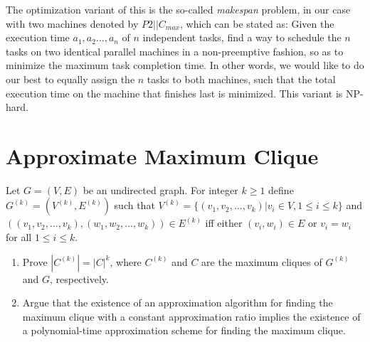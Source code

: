 \documentclass[11pt]{article}
\begin{document}
    The optimization variant of this is the so-called \textit{makespan} problem, in our case with two machines denoted by $P2||C_{max}$\autocite{Schuurman00}, which can be stated as: Given the execution time $a_1, a_2 \dots, a_n$ of $n$ independent tasks, find a way to schedule the $n$ tasks on two identical parallel machines in a non-preemptive fashion, so as to minimize the maximum task completion time. In other words, we would like to do our best to equally assign the $n$ tasks to both machines, such that the total execution time on the machine that finishes last is minimized. This variant is NP-hard.\autocite{Karp72}

  \section{Approximate Maximum Clique}
    Let $G = (V,E)$ be an undirected graph. For integer $k \geq 1$ define $G^{(k)} = (V^{(k)}, E^{(k)})$ such that $V^{(k)} = \{(v_1, v_2, \dots, v_k) | v_i \in V, 1 \leq i \leq k\}$ and $((v_1, v_2, \dots, v_k), (w_1 ,w_2 ,\dots ,w_k)) \in E^{(k)}$ iff either $(v_i, w_i) \in E$ or $v_i = w_i$ for all $1 \leq i \leq k$.
    \begin{enumerate}[leftmargin=*]
      \item Prove $|C^{(k)}| = |C|^k$, where $C^{(k)}$ and $C$ are the maximum cliques of $G^{(k)}$ and $G$, respectively.
      \item Argue that the existence of an approximation algorithm for finding the maximum clique with a constant approximation ratio implies the existence of a polynomial-time approximation scheme for finding the maximum clique.
    \end{enumerate}
\end{document}

